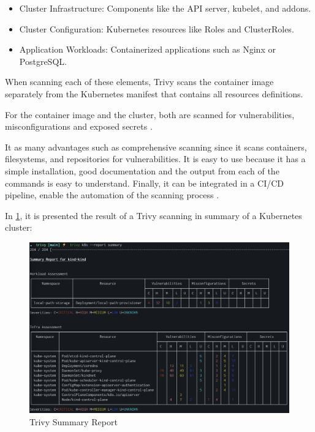 \documentclass[a4paper,11pt,openright,BCOR=15mm]{scrbook}
\begin{document}
\begin{itemize}
	\item Cluster Infrastructure: Components like the API server, kubelet, and addons.
	\item Cluster Configuration: Kubernetes resources like Roles and ClusterRoles.
	\item Application Workloads: Containerized applications such as Nginx or PostgreSQL.
\end{itemize}

When scanning each of these elements, Trivy scans the container image separately from the Kubernetes manifest that contains all resources definitions.

For the container image and the cluster, both are scanned for vulnerabilities, misconfigurations and exposed secrets \cite{trivy_doc_kubernetes_nodate}.

It as many advantages such as comprehensive scanning since it scans containers, filesystems, and repositories for vulnerabilities. It is easy to use because it has a simple installation, good documentation and the output from each of the commands is easy to understand. Finally, it can be integrated in a CI/CD pipeline, enable the automation of the scanning process \cite{benhassan_deep_2024}.

In \ref{fig:trivyResult}, it is presented the result of a Trivy scanning in summary of a Kubernetes cluster:

\begin{figure}[H]
	\centering
	\label{fig:trivyResult}
	\includegraphics[scale=0.3]{figs/trivy-summary-output.png}
	\caption{Trivy Summary Report \cite{trivy_doc_kubernetes_nodate}}
\end{figure}
\end{document}
